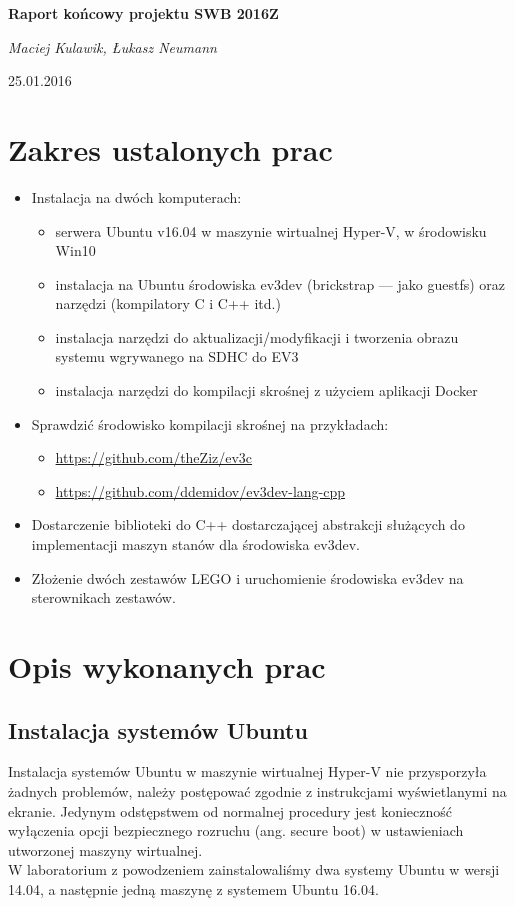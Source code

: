 \documentclass{article}
\begin{document}

\begingroup
    \centering
    \LARGE\textbf{Raport końcowy projektu SWB 2016Z}\\[0.75em]
    \vspace{0.2cm}
    {\large\itshape Maciej Kulawik, Łukasz Neumann\par}
    \vspace{0.5cm}
    {\large 25.01.2016\par}
\endgroup


\section{Zakres ustalonych prac}
\begin{itemize}
    \item Instalacja na dwóch komputerach:
        \begin{itemize}
            \item serwera Ubuntu v16.04 w maszynie wirtualnej Hyper-V, w środowisku Win10
            \item instalacja na Ubuntu środowiska ev3dev (brickstrap --- jako guestfs) oraz narzędzi (kompilatory C i C++ itd.)
            \item instalacja narzędzi do aktualizacji/modyfikacji i tworzenia obrazu systemu wgrywanego na SDHC do EV3
            \item instalacja narzędzi do kompilacji skrośnej z użyciem aplikacji Docker
        \end{itemize}
    \item Sprawdzić środowisko kompilacji skrośnej na przykładach:
        \begin{itemize}
            \item \url{https://github.com/theZiz/ev3c}
            \item \url{https://github.com/ddemidov/ev3dev-lang-cpp}
        \end{itemize}
    \item Dostarczenie biblioteki do C++ dostarczającej abstrakcji służących do
        implementacji maszyn stanów dla środowiska ev3dev.
    \item Złożenie dwóch zestawów LEGO i uruchomienie środowiska ev3dev na
        sterownikach zestawów.
\end{itemize}
\section{Opis wykonanych prac}
\subsection{Instalacja systemów Ubuntu}
Instalacja systemów Ubuntu w maszynie wirtualnej Hyper-V nie przysporzyła
żadnych problemów, należy postępować zgodnie z instrukcjami wyświetlanymi na
ekranie.
Jedynym odstępstwem od normalnej procedury jest konieczność
wyłączenia opcji bezpiecznego rozruchu (ang. secure boot)
w ustawieniach utworzonej maszyny wirtualnej.\\
W laboratorium z powodzeniem zainstalowaliśmy dwa systemy Ubuntu w wersji 14.04, a następnie
jedną maszynę z systemem Ubuntu 16.04.
\end{document}
